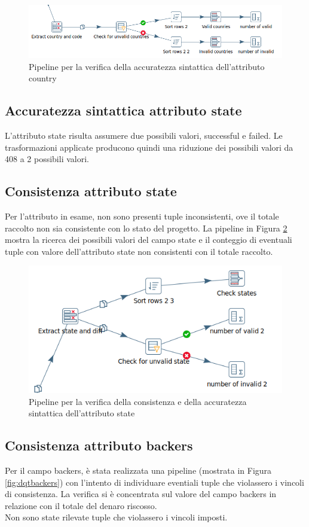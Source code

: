 \begin{figure}[h!]
	\centering
	\includegraphics[width=1\linewidth]{images/DQT_countries}
	\caption{Pipeline per la verifica della accuratezza sintattica dell'attributo country}
	\label{fig:dqtcountries}
\end{figure}


\subsection{Accuratezza sintattica attributo state}
L'attributo state risulta assumere due possibili valori, successful e failed. Le trasformazioni applicate producono quindi una riduzione dei possibili valori da 408 a 2 possibili valori.

\subsection{Consistenza attributo state}
Per l'attributo in esame, non sono presenti tuple inconsistenti, ove il totale raccolto non sia consistente con lo stato del progetto. La pipeline in Figura \ref{fig:dqtstate} mostra la ricerca dei possibili valori del campo state e il conteggio di eventuali tuple con valore dell'attributo state non consistenti con il totale raccolto.

\begin{figure}[h!]
	\centering
	\includegraphics[width=0.6\linewidth]{images/DQT_state}
	\caption{Pipeline per la verifica della consistenza e della accuratezza sintattica dell'attributo state}
	\label{fig:dqtstate}
\end{figure}

\subsection{Consistenza attributo backers}
Per il campo backers, è stata realizzata una pipeline (mostrata in Figura \ref{fig:dqtbackers}) con l'intento di individuare eventiali tuple che violassero i vincoli di consistenza. La verifica si è concentrata sul valore del campo backers in relazione con il totale del denaro riscosso.\\
Non sono state rilevate tuple che violassero i vincoli imposti.

